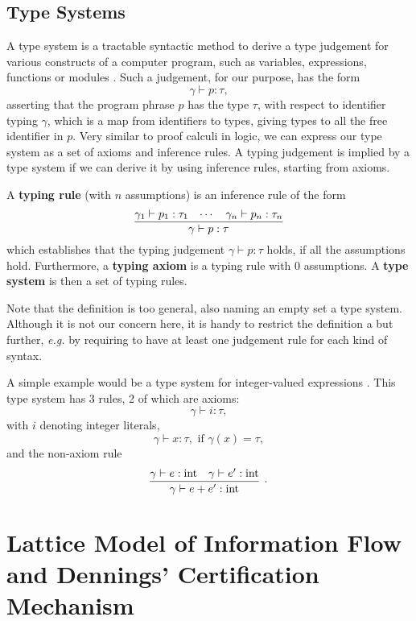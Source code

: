 \documentclass{llncs}
\newcommand{\lit}[1]{\mathrm{#1}}
\begin{document}
\subsection{Type Systems}

A type system is a tractable syntactic method to derive a type judgement for  various constructs of a computer program, such as variables, expressions, functions or modules \cite{Pierce2002}. Such a judgement, for our purpose, has the form
\[
\gamma \vdash p : \tau,
\]
asserting that the program phrase $p$ has the type $\tau$, with respect to identifier typing $\gamma$, which is a map from identifiers to types, giving types to all the free identifier in $p$. Very similar to proof calculi in logic, we can express our type system as a set of axioms and inference rules. A typing judgement is implied by a type system if we can derive it by using inference rules, starting from axioms.

\begin{definition}
A \textbf{typing rule} (with $n$ assumptions) is an inference rule of the form
\[
\infer{\gamma \vdash p : \tau}{
    \gamma_1 \vdash p_1 : \tau_1
    &
    \cdots
    &
    \gamma_n \vdash p_n : \tau_n
}
\]
which establishes that the typing judgement $\gamma \vdash p : \tau$ holds, if all the assumptions hold. Furthermore, a \textbf{typing axiom} is a typing rule with 0 assumptions. A \textbf{type system} is then a set of typing rules.
\end{definition}

Note that the definition is too general, also naming an empty set a type system. Although it is not our concern here, it is handy to restrict the definition a but further, \textit{e.g.} by requiring to have at least one judgement rule for each kind of syntax.

\begin{example}
A simple example would be a type system for integer-valued expressions \cite{VolpanoIS96}.
This type system has 3 rules, 2 of which are axioms:
\[
\gamma \vdash i : \tau,
\]
with $i$ denoting integer literals,
\[
\gamma \vdash x : \tau, \mbox{ if } \gamma(x) = \tau,
\]
and the non-axiom rule
\[
\infer[.]{\gamma \vdash e + e' : \lit{int}}{
    \gamma \vdash e : \lit{int}
    &
    \gamma \vdash e' : \lit{int}
}
\]
\end{example}

\section{Lattice Model of Information Flow and Dennings' Certification Mechanism}
\end{document}

